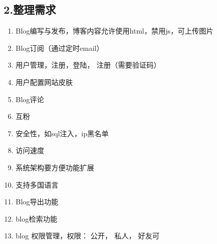 \documentclass[a4paper,oneside,12pt]{book}
\newenvironment{SChinese}{
  \CJKfamily{gkai}
  \CJKtilde
  \CJKnospace}{}
\begin{document}
\begin{CJK*}{UTF8}{kai}
\begin{SChinese}
\begin{flushleft}
\section*{2.整理需求}
\begin{enumerate}
\item{ Blog编写与发布，博客内容允许使用html，禁用js，可上传图片}
\item{ Blog订阅（通过定时email）}
\item{ 用户管理，注册，登陆， 注册（需要验证码）}
\item{ 用户配置网站皮肤}
\item{ Blog评论}
\item{ 互粉}
\item{ 安全性，如sql注入，ip黑名单}
\item{ 访问速度}
\item{ 系统架构要方便功能扩展}
\item{ 支持多国语言}
\item{ Blog导出功能}
\item{ blog检索功能}
\item{ blog 权限管理，权限： 公开， 私人， 好友可}
\end{enumerate}
\end{flushleft}
\end{SChinese}
\end{CJK*}
\end{document}
